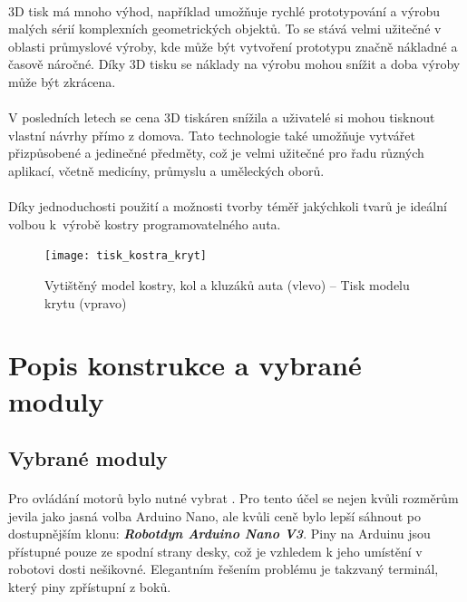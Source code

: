\documentclass[12pt]{article}
\begin{document}
\begin{spacing}{1.5}
	\paragraph{} 3D tisk má mnoho výhod, například umožňuje rychlé prototypování a výrobu malých sérií komplexních geometrických objektů. To se stává velmi užitečné v oblasti průmyslové výroby, kde může být vytvoření prototypu značně nákladné a časově náročné. Díky 3D tisku se náklady na výrobu mohou snížit a doba výroby může být zkrácena.
	
	\paragraph{} V posledních letech se cena 3D tiskáren snížila a uživatelé si mohou tisknout vlastní návrhy přímo z domova. Tato technologie také umožňuje vytvářet přizpůsobené a jedinečné předměty, což je velmi užitečné pro řadu různých aplikací, včetně medicíny, průmyslu a uměleckých oborů.
	
	\paragraph{} Díky jednoduchosti použití a možnosti tvorby téměř jakýchkoli tvarů je ideální volbou k~výrobě kostry programovatelného auta.
	
	\begin{figure}[H]
		\centering
		\texttt{[image: tisk\_kostra\_kryt]}
		\caption{Vytištěný model kostry, kol a kluzáků auta (vlevo) -- Tisk modelu krytu (vpravo)}
		\label{fig:tisk_kostra_kryt}
	\end{figure}

	\newpage
	\section{Popis konstrukce a vybrané moduly}
	\subsection{Vybrané moduly}
	
	\paragraph{} Pro ovládání motorů bylo nutné vybrat . Pro tento účel se nejen kvůli rozměrům jevila jako jasná volba Arduino Nano, ale kvůli ceně bylo lepší sáhnout po dostupnějším klonu: \textbf{\textit{Robotdyn Arduino Nano V3}}.
	Piny na Arduinu jsou přístupné pouze ze spodní strany desky, což je vzhledem k jeho umístění v robotovi dosti nešikovné. Elegantním řešením problému je takzvaný terminál, který piny zpřístupní z boků.
	

\end{spacing}
\end{document}
